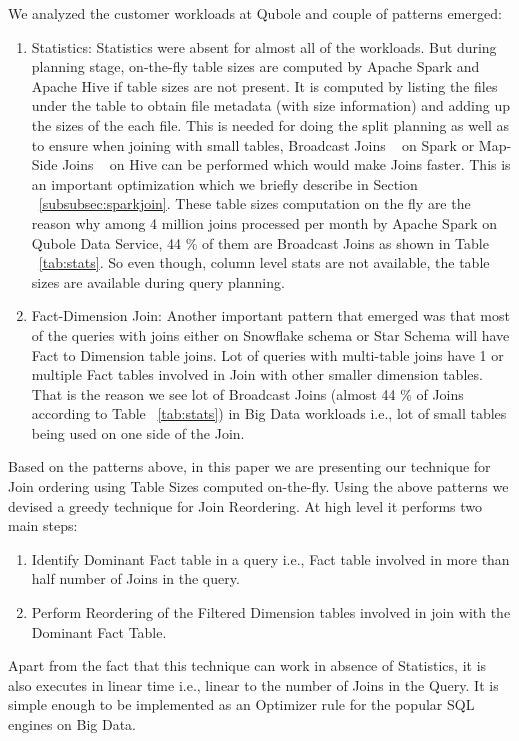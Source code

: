 \documentclass[conference]{IEEEtran}
\begin{document}
We analyzed the customer workloads at Qubole and couple of patterns emerged:
\begin{enumerate}
\item Statistics: Statistics were absent for almost all of the workloads. But  during planning stage, on-the-fly table sizes are computed by Apache Spark and Apache Hive if table sizes are not present. It is computed by listing the files under the table to obtain file metadata (with size information) and adding up the sizes of the each file. This is needed for doing the split planning as well as to ensure when joining with small tables, Broadcast Joins ~\cite{b13} on Spark or Map-Side Joins ~\cite{b10} on Hive can be performed which would make Joins faster. This is an important optimization which we briefly describe in Section ~\ref{subsubsec:sparkjoin}. These table sizes computation on the fly are the reason why among 4 million joins processed per month by Apache Spark on Qubole Data Service, 44 \% of them are Broadcast Joins as shown in Table ~\ref{tab:stats}. So even though, column level stats are not available, the table sizes are available during query planning.
\item Fact-Dimension Join: Another important pattern that emerged was that most of the queries with joins either on Snowflake schema or Star Schema will have Fact to Dimension table joins. Lot of queries with multi-table joins have 1 or multiple Fact tables involved in Join with other smaller dimension tables. That is the reason we see lot of Broadcast Joins (almost 44 \% of Joins according to Table ~\ref{tab:stats}) in Big Data workloads i.e., lot of small tables being used on one side of the Join.
\end{enumerate}

Based on the patterns above, in this paper we are presenting our technique for Join ordering using Table Sizes computed on-the-fly. Using the above patterns we devised a greedy technique for Join Reordering. At high level it performs two main steps:
\begin{enumerate}
\item Identify Dominant Fact table in a query i.e., Fact table involved in more than half number of Joins in the query. 
\item Perform Reordering of the Filtered Dimension tables involved in join with the Dominant Fact Table.
\end{enumerate}

Apart from the fact that this technique can work in absence of Statistics, it is also executes in linear time i.e., linear to the number of Joins in the Query. It is simple enough to be implemented as an Optimizer rule for the popular SQL engines on Big Data.  
\end{document}
